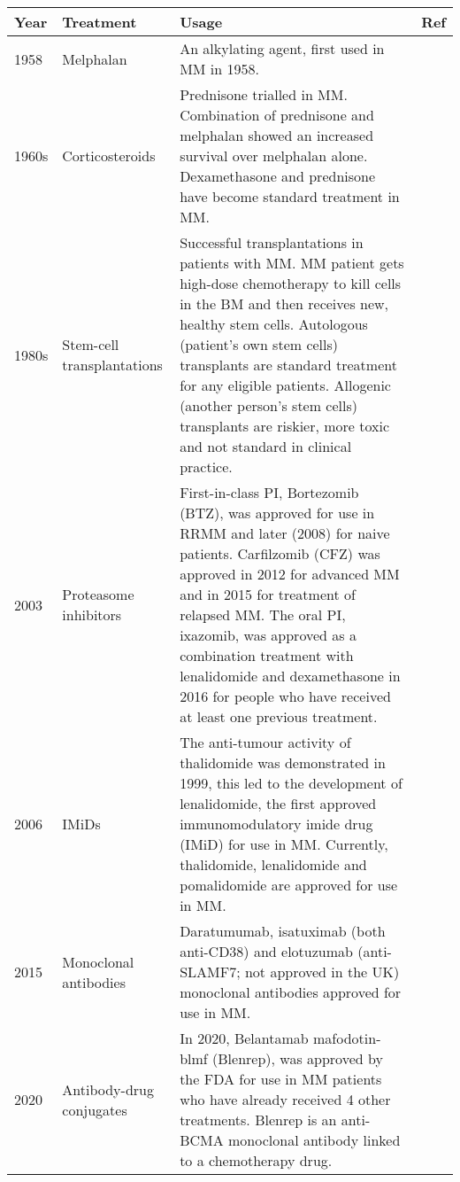 %
%
\begin{table}[hpt]
\centering
\begin{tabular}{|p{1cm}|p{2.6cm}|p{8.5cm}|p{1.28cm}|}
\hline
\textbf{Year} & \textbf{Treatment} & \textbf{Usage} & \textbf{Ref} \\ \hline
1958 & Melphalan & An alkylating agent, first used in MM in 1958. & \cite{blokhin1958clinical} \\ \hline
1960s & Corticosteroids & Prednisone trialled in MM. Combination of prednisone and melphalan showed an increased survival over melphalan alone. Dexamethasone and prednisone have become standard treatment in MM\@. & \cite{mass1962comparison, alexanian1969treatment} \\ \hline
1980s & Stem-cell transplantations & Successful transplantations in patients with MM. MM patient gets high-dose chemotherapy to kill cells in the BM and then receives new, healthy stem cells. Autologous (patient's own stem cells) transplants are standard treatment for any eligible patients. Allogenic (another person's stem cells) transplants are riskier, more toxic and not standard in clinical practice. &  \cite{mcelwain1983high,osserman1982identical,fefer1986identical,gahrton1987bone,stemcellMM2022}  \\ \hline
2003 & Proteasome inhibitors & First-in-class PI, Bortezomib (BTZ), was approved for use in RRMM and later (2008) for naive patients. Carfilzomib (CFZ) was approved in 2012 for advanced MM and in 2015 for treatment of relapsed MM. The oral PI, ixazomib, was approved as a combination treatment with lenalidomide and dexamethasone in 2016 for people who have received at least one previous treatment. & \cite{kane2003velcade,richardson2003phase,katsnelson2012next} \\ \hline
2006 & IMiDs & The anti-tumour activity of thalidomide was demonstrated in 1999, this led to the development of lenalidomide, the first approved immunomodulatory imide drug (IMiD) for use in MM. Currently, thalidomide, lenalidomide and pomalidomide are approved for use in MM\@. & \cite{singhal1999antitumor,label47revlimid,san2013pomalidomide} \\ \hline
2015 & Monoclonal antibodies & Daratumumab, isatuximab (both anti-CD38) and elotuzumab (anti-SLAMF7; not approved in the UK) monoclonal antibodies approved for use in MM\@. & \cite{lokhorst2015targeting,lonial2015elotuzumab} \\ \hline
2020 & Antibody-drug conjugates & In 2020, Belantamab mafodotin-blmf (Blenrep), was approved by the FDA for use in MM patients who have already received 4 other treatments. Blenrep is an anti-BCMA monoclonal antibody linked to a chemotherapy drug. & \cite{fdaBlenrep, markham2020belantamab} \\ \hline

\end{tabular}
\end{table}
